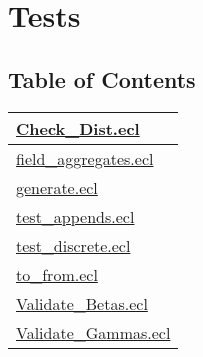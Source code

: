 \chapter*{Tests}
\hypertarget{ecldoc:toc:ML_Core/Tests}{}


\section*{Table of Contents}
{\renewcommand{\arraystretch}{1.5}
\begin{longtable}{|p{\textwidth}|}
\hline
\hyperlink{ecldoc:toc:ML_Core.Tests.Check_Dist}{Check\_Dist.ecl} \\
\hline
\hyperlink{ecldoc:toc:ML_Core.Tests.field_aggregates}{field\_aggregates.ecl} \\
\hline
\hyperlink{ecldoc:toc:ML_Core.Tests.generate}{generate.ecl} \\
\hline
\hyperlink{ecldoc:toc:ML_Core.Tests.test_appends}{test\_appends.ecl} \\
\hline
\hyperlink{ecldoc:toc:ML_Core.Tests.test_discrete}{test\_discrete.ecl} \\
\hline
\hyperlink{ecldoc:toc:ML_Core.Tests.to_from}{to\_from.ecl} \\
\hline
\hyperlink{ecldoc:toc:ML_Core.Tests.Validate_Betas}{Validate\_Betas.ecl} \\
\hline
\hyperlink{ecldoc:toc:ML_Core.Tests.Validate_Gammas}{Validate\_Gammas.ecl} \\
\hline
\end{longtable}
}









